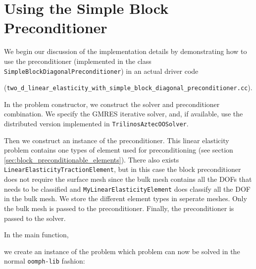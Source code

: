 \section{Using the Simple Block Preconditioner\label{sec:using_the_simple_block_preconditioner}}

We begin our discussion of the implementation details by demonstrating how to 
use the preconditioner (implemented in the class 
\verb+SimpleBlockDiagonalPreconditioner+) in an actual driver code 

(\verb+two_d_linear_elasticity_with_simple_block_diagonal_preconditioner.cc+).

In the problem constructor, we construct the solver and preconditioner combination. We specify the GMRES iterative solver, and, if available, use the distributed version implemented in \verb+TrilinosAztecOOSolver+.
\lstset{numberstyle=\scriptsize,breaklines=true, numbers=left, stepnumber=2, frame=single,basicstyle=\ttfamily\scriptsize, showstringspaces=false, language=C++}

Then we construct an instance of the preconditioner. This linear elasticity problem contains one types of element used for preconditioning (see section \ref{sec:block_preconditionable_elements}). There also exists \verb+LinearElasticityTractionElement+, but in this case the block preconditioner does not require the surface mesh since the bulk mesh contains all the DOFs that needs to be classified and \verb+MyLinearElasticityElement+ does classify all the DOF in the bulk mesh. We store
the different element types in seperate meshes. Only the bulk mesh is passed to the preconditioner. Finally, the preconditioner is passed to the 
solver.
\lstset{numberstyle=\scriptsize,breaklines=true, numbers=left, stepnumber=2, frame=single,basicstyle=\ttfamily\scriptsize, showstringspaces=false, language=C++}

In the main function,
\lstset{numberstyle=\scriptsize,breaklines=true, numbers=left, stepnumber=2, frame=single,basicstyle=\ttfamily\scriptsize, showstringspaces=false, language=C++}

we create an instance of the  problem which problem can now be solved in the normal \verb+oomph-lib+ fashion:
\lstset{numberstyle=\scriptsize,breaklines=true, numbers=left, stepnumber=2, frame=single,basicstyle=\ttfamily\scriptsize, showstringspaces=false, language=C++}



